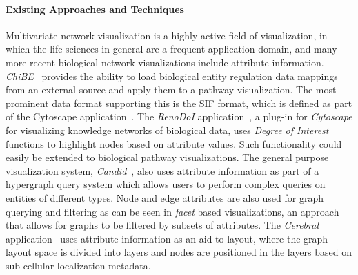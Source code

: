 \documentclass[twocolumn]{bmcart}%
\begin{document}
\paragraph*{Existing Approaches and Techniques}

Multivariate network visualization is a highly active field of visualization, in which the life sciences in general are a frequent application domain, and many more recent biological network visualizations include attribute information.
\textit{ChiBE}~\cite{Babur2010chibe} provides the ability to load biological entity regulation data mappings from an external source and apply them to a pathway visualization.
The most prominent data format supporting this is the SIF format, which is defined as part of the Cytoscape application~\cite{Shannon2003cytoscape}.
The \textit{RenoDoI} application~\cite{Vehlow2015}, a plug-in for \textit{Cytoscape} for visualizing knowledge networks of biological data, uses \emph{Degree of Interest} functions to highlight nodes based on attribute values.
Such functionality could easily be extended to biological pathway visualizations.
The general purpose visualization system, \textit{Candid}~\cite{Shadoan2013}, also uses attribute information as part of a hypergraph query system which allows users to perform complex queries on entities of different types.
Node and edge attributes are also used for graph querying and filtering as can be seen in \textit{facet} based visualizations, an approach that allows for graphs to be filtered by subsets of attributes.
The \textit{Cerebral} application~\cite{Barsky2008cerebral} uses attribute information as an aid to layout, where the graph layout space is divided into layers and nodes are positioned in the layers based on sub-cellular localization metadata.
\end{document}

